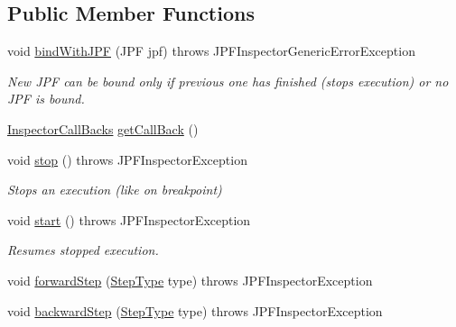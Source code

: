 \subsection*{Public Member Functions}
\begin{DoxyCompactItemize}
\item 
void \hyperlink{interfacegov_1_1nasa_1_1jpf_1_1inspector_1_1interfaces_1_1_j_p_f_inspector_back_end_interface_aa6053d5106dec6cab7a2168e6a2f0804}{bind\+With\+J\+PF} (J\+PF jpf)  throws J\+P\+F\+Inspector\+Generic\+Error\+Exception
\begin{DoxyCompactList}\small\item\em New J\+PF can be bound only if previous one has finished (stops execution) or no J\+PF is bound. \end{DoxyCompactList}\item 
\hyperlink{interfacegov_1_1nasa_1_1jpf_1_1inspector_1_1interfaces_1_1_inspector_call_backs}{Inspector\+Call\+Backs} \hyperlink{interfacegov_1_1nasa_1_1jpf_1_1inspector_1_1interfaces_1_1_j_p_f_inspector_back_end_interface_a21714f0ec11b7faad1e05314db452b93}{get\+Call\+Back} ()
\item 
void \hyperlink{interfacegov_1_1nasa_1_1jpf_1_1inspector_1_1interfaces_1_1_commands_interface_a4dc6ea27e2df05a4f16dfd357dec0acf}{stop} ()  throws J\+P\+F\+Inspector\+Exception
\begin{DoxyCompactList}\small\item\em Stops an execution (like on breakpoint) \end{DoxyCompactList}\item 
void \hyperlink{interfacegov_1_1nasa_1_1jpf_1_1inspector_1_1interfaces_1_1_commands_interface_a4c7644c0aa203769bba68374c0cb07ea}{start} ()  throws J\+P\+F\+Inspector\+Exception
\begin{DoxyCompactList}\small\item\em Resumes stopped execution. \end{DoxyCompactList}\item 
void \hyperlink{interfacegov_1_1nasa_1_1jpf_1_1inspector_1_1interfaces_1_1_commands_interface_ad5c3596280086831444dcb06079c9412}{forward\+Step} (\hyperlink{enumgov_1_1nasa_1_1jpf_1_1inspector_1_1interfaces_1_1_commands_interface_1_1_step_type}{Step\+Type} type)  throws J\+P\+F\+Inspector\+Exception
\item 
void \hyperlink{interfacegov_1_1nasa_1_1jpf_1_1inspector_1_1interfaces_1_1_commands_interface_a6a6a733100d8162d5f18063519a88257}{backward\+Step} (\hyperlink{enumgov_1_1nasa_1_1jpf_1_1inspector_1_1interfaces_1_1_commands_interface_1_1_step_type}{Step\+Type} type)  throws J\+P\+F\+Inspector\+Exception

\end{DoxyCompactItemize}
